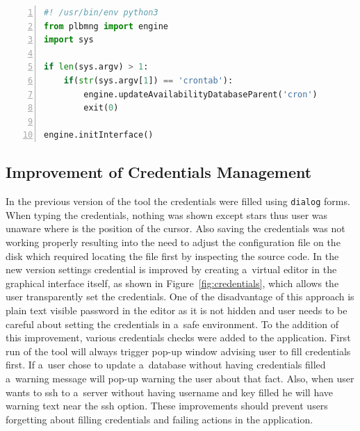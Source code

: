 {{{{{\noindent\begin{minipage}{\linewidth}
\begin{lstlisting}[language=Python, numbers=left, label={lst:plbmngbin}, caption=Source code of the main script populated by PyPI installer into executable folders., frame=single, showstringspaces=false, breaklines=true, keywordstyle=\color{blue},captionpos=b]
#! /usr/bin/env python3
from plbmng import engine
import sys

if len(sys.argv) > 1:
	if(str(sys.argv[1]) == 'crontab'):
		engine.updateAvailabilityDatabaseParent('cron')
		exit(0)

engine.initInterface()
\end{lstlisting}
\end{minipage}}

\subsection{Improvement of Credentials Management}
In the previous version of the tool the credentials were filled using \texttt{dialog} forms. When typing the credentials, nothing was shown except stars thus user was unaware where is the position of the cursor. Also saving the credentials was not working properly resulting into the need to adjust the configuration file on the disk which required locating the file first by inspecting the source code. In the new version settings credential is improved by creating a~virtual editor in the graphical interface itself, as shown in Figure~\ref{fig:credentials}, which allows the user transparently set the credentials. One of the disadvantage of this approach is plain text visible password in the editor as it is not hidden and user needs to be careful about setting the credentials in a~safe environment. To the addition of this improvement, various credentials checks were added to the application. First run of the tool will always trigger pop-up window advising user to fill credentials first. If a~user chose to update a~database without having credentials filled a~warning message will pop-up warning the user about that fact. Also, when user wants to ssh to a~server without having username and key filled he will have warning text near the ssh option. These improvements should prevent users forgetting about filling credentials and failing actions in the application.

}}}}
